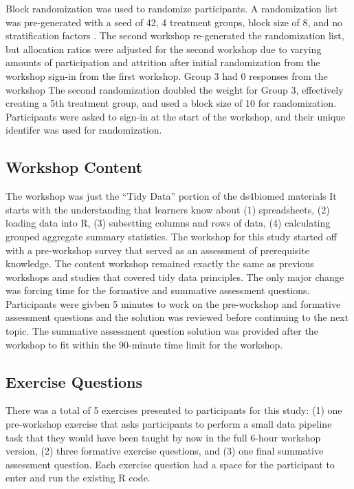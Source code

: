 \documentclass[040-assessment.tex]{subfiles}
\begin{document}
    Block randomization was used to randomize participants.
    A randomization list was pre-generated with a
    seed of 42, 4 treatment groups, block size of 8, and no stratification factors
    \cite{sealedenvelopeltdCreateBlockedRandomisation2021}.
    The second workshop re-generated the randomization list,
    but allocation ratios were adjusted for the second workshop due to varying amounts of participation
    and attrition after initial randomization from the workshop sign-in from the first workshop.
    Group 3 had 0 responses from the workshop
    The second randomization doubled the weight for Group 3,
    effectively creating a 5th treatment group, and used a block size of 10 for randomization.
    Participants were asked to sign-in at the start of the workshop,
    and their unique identifer was used for randomization.

\subsection{Workshop Content}

    The workshop was just the ``Tidy Data'' portion of the ds4biomed materials %
    It starts with the understanding that learners know about
    (1) spreadsheets,
    (2) loading data into R,
    (3) subsetting columns and rows of data,
    (4) calculating grouped aggregate summary statistics.
    The workshop for this study started off with a pre-workshop survey that served as an assessment of
    prerequisite knowledge.
    The content workshop remained exactly the same as previous workshops and studies
    that covered tidy data principles.
    The only major change was forcing time for the formative and summative assessment questions.
    Participants were givben 5 minutes to work on the pre-workshop and formative assessment questions
    and the solution was reviewed before continuing to the next topic.
    The summative assessment question solution was provided after the workshop to fit within the
    90-minute time limit for the workshop.

\subsection{Exercise Questions}

There was a total of 5 exercises presented to participants for this study:
(1) one pre-workshop exercise that asks participants to perform a small data pipeline task that they would
    have been taught by now in the full 6-hour workshop version,
(2) three formative exercise questions, and
(3) one final summative assessment question.
Each exercise question had a space for the participant to enter and run the existing R code.
\end{document}
